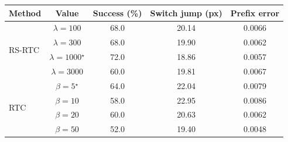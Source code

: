 \begin{tabular}{l c c c c}
\toprule
Method & Value & Success (\%) & Switch jump (px) & Prefix error \\
\midrule
\multirow{4}{*}{RS-RTC} & $\lambda=100$ & 68.0 & 20.14 & 0.0066 \\
 & $\lambda=300$ & 68.0 & 19.90 & 0.0062 \\
 & $\lambda=1000$$^\star$ & 72.0 & 18.86 & 0.0057 \\
 & $\lambda=3000$ & 60.0 & 19.81 & 0.0067 \\
\midrule
\multirow{4}{*}{RTC} & $\beta=5$$^\star$ & 64.0 & 22.04 & 0.0079 \\
 & $\beta=10$ & 58.0 & 22.95 & 0.0086 \\
 & $\beta=20$ & 60.0 & 20.63 & 0.0062 \\
 & $\beta=50$ & 52.0 & 19.40 & 0.0048 \\
\bottomrule
\end{tabular}
